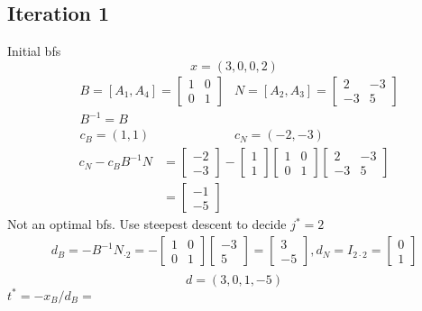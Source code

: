 \documentclass[11pt]{article}
\begin{document}
\subsection{Iteration 1}
Initial bfs $$x = (3, 0, 0, 2)$$
\begin{align*}
    & B = [A_1, A_4] = \begin{bmatrix} 1 & 0 \\ 0 & 1\end{bmatrix} & N = [A_2, A_3] = \begin{bmatrix} 2 & -3 \\ -3 & 5\end{bmatrix} \\
    & B^{-1} = B \\
    & c_B = (1, 1) & c_N = (-2, -3)
\end{align*}
\begin{align*}
    c_N - c_B B^{-1}N &= \begin{bmatrix} -2 \\ -3\end{bmatrix} - \begin{bmatrix} 1 \\ 1\end{bmatrix} \begin{bmatrix} 1 & 0 \\ 0 & 1\end{bmatrix} \begin{bmatrix} 2 & -3 \\ -3 & 5\end{bmatrix}\\
    &= \begin{bmatrix} -1 \\ -5\end{bmatrix}
\end{align*}
Not an optimal bfs. 
Use steepest descent to decide $j^* = 2$
\begin{align*}
    d_B = -B^{-1} N_{\cdot 2} = -\begin{bmatrix} 1 & 0 \\ 0 & 1\end{bmatrix} \begin{bmatrix} -3 \\ 5\end{bmatrix} = \begin{bmatrix} 3 \\ -5 \end{bmatrix}, d_N = I_{2\cdot 2} = \begin{bmatrix} 0 \\ 1\end{bmatrix} \\
\end{align*}
$$d = (3, 0, 1, -5)$$
$t^* = -x_B / d_B = $
\end{document}
